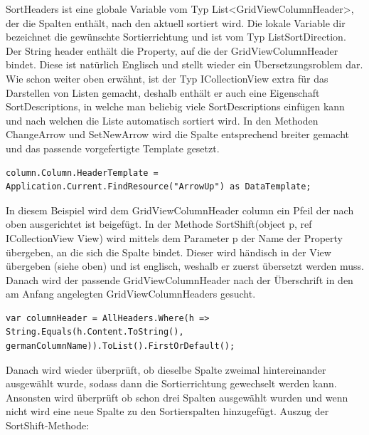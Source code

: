 SortHeaders ist eine globale Variable vom Typ List<GridViewColumnHeader>, der die Spalten enthält, nach den aktuell sortiert wird. Die lokale Variable dir bezeichnet die gewünschte Sortierrichtung und ist vom Typ ListSortDirection. Der String header enthält die Property, auf die der GridViewColumnHeader bindet. Diese ist natürlich Englisch und stellt wieder ein Übersetzungsroblem dar. Wie schon weiter oben erwähnt, ist der Typ ICollectionView extra für das Darstellen von Listen gemacht, deshalb enthält er auch eine Eigenschaft SortDescriptions, in welche man beliebig viele SortDescriptions einfügen kann und nach welchen die Liste automatisch sortiert wird. In den Methoden ChangeArrow und SetNewArrow wird die Spalte entsprechend breiter gemacht und das passende vorgefertigte Template gesetzt.
\begin{lstlisting}
column.Column.HeaderTemplate = Application.Current.FindResource("ArrowUp") as DataTemplate;
\end{lstlisting}
In diesem Beispiel wird dem GridViewColumnHeader column ein Pfeil der nach oben ausgerichtet ist beigefügt.
In der Methode SortShift(object p, ref ICollectionView View) wird mittels dem Parameter p der Name der Property übergeben, an die sich die Spalte bindet. Dieser wird händisch in der View übergeben (siehe oben) und ist englisch, weshalb er zuerst übersetzt werden muss. Danach wird der passende GridViewColumnHeader nach der Überschrift in den am Anfang angelegten GridViewColumnHeaders gesucht.

\begin{lstlisting}
var columnHeader = AllHeaders.Where(h => String.Equals(h.Content.ToString(), germanColumnName)).ToList().FirstOrDefault();
\end{lstlisting}
Danach wird wieder überprüft, ob dieselbe Spalte zweimal hintereinander ausgewählt wurde, sodass dann die Sortierrichtung gewechselt werden kann. Ansonsten wird überprüft ob schon drei Spalten ausgewählt wurden und wenn nicht wird eine neue Spalte zu den Sortierspalten hinzugefügt.
Auszug der SortShift-Methode:

